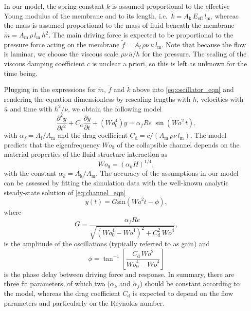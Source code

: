 \documentclass[aps,prl,reprint,superscriptaddress,floatfix]{revtex4-1}
\newcommand{\Rey}{\mathit{Re}}
\newcommand{\Wo}{\mathit{Wo}}
\begin{document}
In our model, the spring constant $k$ is assumed proportional to the effective Young modulus of the membrane and to its length, i.e.~$\tilde k=A_\text{k}\, E_\text{eff}\,l_\text{m}$, whereas the mass is assumed proportional to the mass of fluid beneath the membrane $\tilde m=A_\text{m}\, \rho\, l_\text{m}\, h^2$. The main driving force is expected to be proportional to the pressure force acting on the membrane $\tilde f=A_\text{f}\,\rho\nu\, \bar{u}\, l_\text{m}$. Note that because the flow is laminar, we choose the viscous scale $\rho\nu\, \bar{u}/h$ for the pressure. The scaling of the viscous damping coefficient $c$ is unclear a priori, so this is left as unknown for the time being. 

Plugging in the expressions for $\tilde m$,  $\tilde f$ and $\tilde k$ above into \eqref{eq:oscillator_eqn} and rendering the equation dimensionless by rescaling lengths with $h$, velocities with $\bar{u}$ and time with $h^2/\nu$, we obtain the following model 
\begin{equation}
\frac{\partial^2 y}{\partial t^2}+C_\text{d}\frac{\partial y}{\partial t}+\left(\Wo^4_0\right)y={\alpha_f}{\Rey}\;\sin\left(\Wo^2 \, t\right),
\label{eq:channel_eqn}
\end{equation}
with $\alpha_f=A_\text{f}/A_\text{m}$ and the drag coefficient $C_\text{d}=c/(A_\text{m}\,\rho\nu\,l_\text{m})$. The model predicts that the eigenfrequency $\Wo_0$ of the collapsible channel depends on the material properties of the fluid-structure interaction as
\begin{equation}\label{eq:model_St0}
\Wo_0=({\alpha_k}H)^{1/4},
\end{equation}
with the constant $\alpha_k=A_\text{k}/A_\text{m}$. The accuracy of the assumptions in our model can be assessed by fitting the simulation data with the well-known analytic steady-state solution of \eqref{eq:channel_eqn} 
\begin{equation}
y(t)=G \text{sin}\left(\Wo^2  t-\phi\right),
\label{eq:channel_solution}
\end{equation}
where 
\begin{equation}
G = \dfrac{{\alpha_f}{\Rey}}{\sqrt{\left(\Wo^4_0-\Wo^4\right)^2+C_\text{d}^2\,\Wo^4}},
\label{eq:channel_gain}
\end{equation}
is the amplitude of the oscillations (typically referred to as gain) and 
\begin{equation}
\phi=\tan^{-1}\left[\dfrac{C_\text{d}\, \Wo^2}{\Wo_0^4-\Wo^4}\right]
\label{eq:channel_phase}
\end{equation}
is the phase delay between driving force and response. In summary, there are three fit parameters, of which two ($\alpha_k$ and $\alpha_f$) should be constant according to the model, whereas the drag coefficient $C_\text{d}$ is expected to depend on the flow parameters and particularly on the Reynolds number. 
\end{document}
